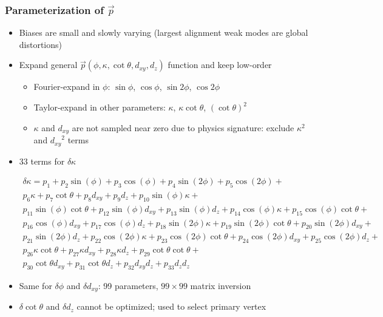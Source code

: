\documentclass[compress]{beamer}
\begin{document}
\begin{frame}
\frametitle{Parameterization of $\vec{p}$}
\begin{itemize}
\item Biases are small and slowly varying (largest alignment weak modes are global distortions)

\item Expand general $\vec{p}(\phi, \kappa, \cot\theta, d_{xy}, d_z)$ function and keep low-order
\begin{itemize}
\item Fourier-expand in $\phi$: $\sin\phi$, $\cos\phi$, $\sin 2\phi$, $\cos 2\phi$
\item Taylor-expand in other parameters: $\kappa$, $\kappa\cot\theta$, $(\cot\theta)^2$
\item $\kappa$ and $d_{xy}$ are not sampled near zero due to physics
  signature: exclude $\kappa^2$ and ${d_{xy}}^2$ terms
\end{itemize}

\item 33 terms for $\delta \kappa$

\vspace{-0.5 cm}
{\scriptsize \begin{multline*}
\delta \kappa = 
p_{1} +
p_{2} \sin(\phi) +
p_{3} \cos(\phi) +
p_{4} \sin(2 \phi) +
p_{5} \cos(2 \phi) + \\
p_{6} \kappa +
p_{7} \cot\theta +
p_{8} d_{xy} +
p_{9} d_z +
p_{10} \sin(\phi) \kappa + \\
p_{11} \sin(\phi) \cot\theta +
p_{12} \sin(\phi) d_{xy} +
p_{13} \sin(\phi) d_z +
p_{14} \cos(\phi) \kappa +
p_{15} \cos(\phi) \cot\theta + \\
p_{16} \cos(\phi) d_{xy} +
p_{17} \cos(\phi) d_z +
p_{18} \sin(2 \phi) \kappa +
p_{19} \sin(2 \phi) \cot\theta +
p_{20} \sin(2 \phi) d_{xy} + \\
p_{21} \sin(2 \phi) d_z +
p_{22} \cos(2 \phi) \kappa +
p_{23} \cos(2 \phi) \cot\theta +
p_{24} \cos(2 \phi) d_{xy} +
p_{25} \cos(2 \phi) d_z + \\
p_{26} \kappa \cot\theta +
p_{27} \kappa d_{xy} +
p_{28} \kappa d_z +
p_{29} \cot\theta \cot\theta + \\
p_{30} \cot\theta d_{xy} +
p_{31} \cot\theta d_z +
p_{32} d_{xy} d_z +
p_{33} d_z d_z
\end{multline*}}

\vspace{-0.5 cm}
\item Same for $\delta \phi$ and $\delta d_{xy}$: 99 parameters, $99\times 99$ matrix inversion

\item $\delta \cot\theta$ and $\delta d_z$ cannot be optimized; used to select primary vertex
\end{itemize}
\end{frame}
\end{document}
